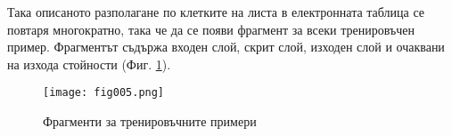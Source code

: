 Така описаното разполагане по клетките на листа в електронната таблица се повтаря многократно, така че да се появи фрагмент за всеки тренировъчен пример. Фрагментът съдържа входен слой, скрит слой, изходен слой и очаквани на изхода стойности (Фиг. \ref{fig005}).

\begin{figure}[h]
  \centering
  \texttt{[image: fig005.png]}
  \caption{Фрагменти за тренировъчните примери}
\label{fig005}
\end{figure}




